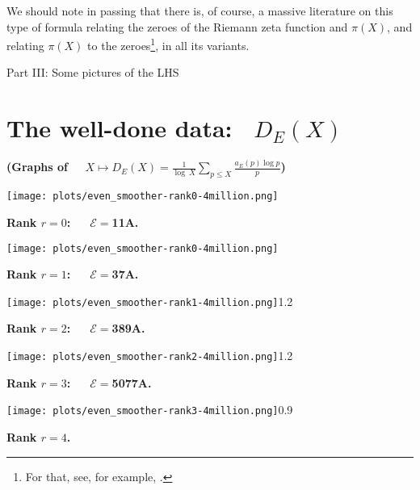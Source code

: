 \documentclass[11pt]{article}
\theoremstyle{plain}
\theoremstyle{definition}
\numberwithin{equation}{section}
\numberwithin{figure}{section}
\numberwithin{table}{section}
\begin{document}
We should note in passing that there is, of course, a massive literature on this type of formula relating the zeroes of the Riemann zeta function and $\pi(X)$, and relating $\pi(X)$ to the zeroes{\footnote{ For that, see, for example, \cite{G}.}}, in all its variants.


\newpage
 \centerline{ \Large{ Part III: Some pictures of the LHS}}
  \vskip30pt


     \section{The well-done data: \  $ {D}_E(X)$}
   \vskip40pt

      \centerline{\bf (Graphs of \ \   $X\mapsto {D}_E(X) = {\frac{1}{\log\ X}}\sum_{p \le X}{\frac{a_E(p)\log p}{ p}}$) }
      \vskip40pt

    \texttt{[image: plots/even\_smoother-rank0-4million.png]}
  \centerline{\bf Rank $r=0$:\ \ \  ${\mathcal E}=$11A.}
   \vskip20pt
    \texttt{[image: plots/even\_smoother-rank0-4million.png]}


 \vskip40pt


  \centerline{\bf Rank $r=1$:\ \ \  ${\mathcal E}=$37A.}


   \vskip20pt



     \texttt{[image: plots/even\_smoother-rank1-4million.png]}{1.2}~\label{s37}
%

   \newpage


  \centerline{\bf Rank $r=2$:\ \ \  ${\mathcal E}=$389A.}


  \vskip20pt




     \texttt{[image: plots/even\_smoother-rank2-4million.png]}{1.2}~\label{s389}


 \vskip20pt


  \centerline{\bf Rank $r=3$:\ \ \  ${\mathcal E}=$5077A.}


 \vskip20pt



     \texttt{[image: plots/even\_smoother-rank3-4million.png]}{0.9}~\label{s5077}


  \vskip10pt

  \centerline{\bf Rank $r=4$.}


  \vskip20pt
\end{document}

